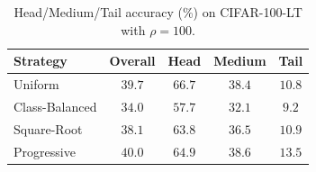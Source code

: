 \begin{table}[htbp]
\centering
\caption{Head/Medium/Tail accuracy (\%) on CIFAR-100-LT with $\rho = 100$.}
\label{tab:hmt_rho100}
\begin{tabular}{lcccc}
\toprule
\textbf{Strategy} & \textbf{Overall} & \textbf{Head} & \textbf{Medium} & \textbf{Tail} \\
\midrule
Uniform & $39.7$ & $66.7$ & $38.4$ & $10.8$ \\
Class-Balanced & $34.0$ & $57.7$ & $32.1$ & $9.2$ \\
Square-Root & $38.1$ & $63.8$ & $36.5$ & $10.9$ \\
Progressive & $40.0$ & $64.9$ & $38.6$ & $13.5$ \\
\bottomrule
\end{tabular}
\end{table}